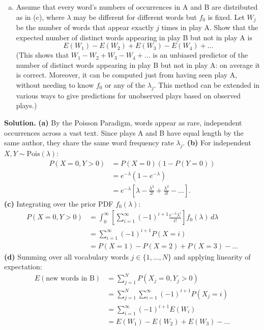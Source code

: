 \documentclass[11pt,a4paper]{article}
\begin{document}
\begin{tcolorbox}[title={HW 7 $\cdot$ Problem 7}]
\begin{enumerate}[(a)]
\[
P(X = 1) - P(X = 2) + P(X = 3) - P(X = 4) + \dots
\]
Hint: Condition on $\lambda$ and use (b).
\item Assume that every word's numbers of occurrences in A and B are distributed as in (c), where $\lambda$ may be different for different words but $f_0$ is fixed. Let $W_j$ be the number of words that appear exactly $j$ times in play A. Show that the expected number of distinct words appearing in play B but not in play A is
\[
E(W_1) - E(W_2) + E(W_3) - E(W_4) + \dots
\]
(This shows that $W_1 - W_2 + W_3 - W_4 + \dots$ is an unbiased predictor of the number of distinct words appearing in play B but not in play A: on average it is correct. Moreover, it can be computed just from having seen play A, without needing to know $f_0$ or any of the $\lambda_j$. This method can be extended in various ways to give predictions for unobserved plays based on observed plays.)
\end{enumerate}
\end{tcolorbox}

\noindent \textbf{Solution.} \textbf{(a)} By the Poisson Paradigm, words appear as rare, independent occurrences across a vast text. Since plays A and B have equal length by the same author, they share the same word frequency rate $\lambda_j$.
\textbf{(b)} For independent $X, Y \sim \text{Pois}(\lambda)$:
\begin{align*}
P(X = 0, Y > 0) &= P(X = 0)(1 - P(Y = 0)) \\
&= e^{-\lambda} \left(1 - e^{-\lambda}\right) \\
&= e^{-\lambda} \left[ \lambda - \frac{\lambda^2}{2!} + \frac{\lambda^3}{3!} - \dots \right].
\end{align*}
\textbf{(c)} Integrating over the prior PDF $f_0(\lambda)$:
\begin{align*}
P(X = 0, Y > 0) &= \int_{0}^{\infty} \left[ \sum_{i=1}^{\infty} (-1)^{i+1} \frac{e^{-\lambda} \lambda^i}{i!} \right] f_0(\lambda) \, d\lambda \\
&= \sum_{i=1}^{\infty} (-1)^{i+1} P(X = i) \\
&= P(X = 1) - P(X = 2) + P(X = 3) - \dots
\end{align*}
\textbf{(d)} Summing over all vocabulary words $j \in \{1, \dots, N\}$ and applying linearity of expectation:
\begin{align*}
E(\text{new words in B}) &= \sum_{j=1}^{N} P(X_j = 0, Y_j > 0) \\
&= \sum_{j=1}^{N} \sum_{i=1}^{\infty} (-1)^{i+1} P(X_j = i) \\
&= \sum_{i=1}^{\infty} (-1)^{i+1} E(W_i) \\
&= E(W_1) - E(W_2) + E(W_3) - \dots
\end{align*}
\end{document}
